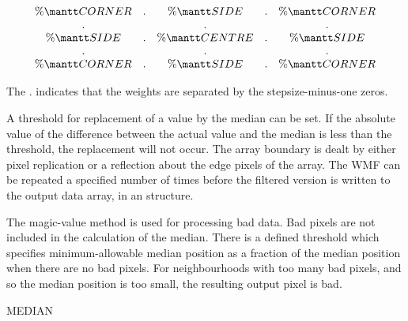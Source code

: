 {\begin{manroutinedescription}
\[\begin{array}{ccccc}
  \%\-{\mantt CORNER} & . &  \%\-{\mantt SIDE}  & . &  \%\-{\mantt CORNER} \\
  . &  & . &  & . \\
  \%\-{\mantt SIDE}  & . &  \%\-{\mantt CENTRE} & . &  \%\-{\mantt SIDE} \\
  . &  & . &  & . \\
  \%\-{\mantt CORNER} & . &  \%\-{\mantt SIDE}  & . &  \%\-{\mantt CORNER}

\end{array}
\]

  The . indicates that the weights are separated by the stepsize-minus-one
  zeros.

  A threshold for replacement of a value by the median can be set.
  If the absolute value of the difference between the actual value
  and the median is less than the threshold, the replacement will
  not occur. The array boundary is dealt by either pixel replication
  or a reflection about the edge pixels of the array. The WMF can be
  repeated a specified number of times before the filtered version
  is written to the output data array, in an {} structure.

  The magic-value method is used for processing bad data. Bad pixels
  are not included in the calculation of the median. There is a
  defined threshold which specifies minimum-allowable median
  position as a fraction of the median position when there are no
  bad pixels.  For neighbourhoods with too many bad pixels, and so
  the median position is too small, the resulting output pixel is
  bad.

  MEDIAN


\end{manroutinedescription}}
